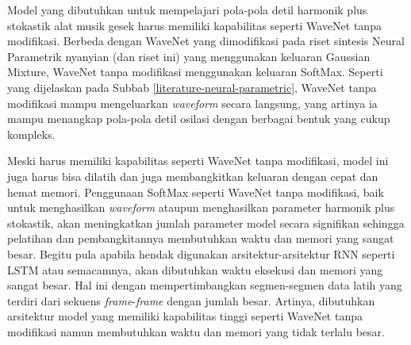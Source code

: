 Model yang dibutuhkan untuk mempelajari pola-pola detil harmonik plus stokastik alat musik gesek harus memiliki kapabilitas seperti WaveNet tanpa modifikasi. Berbeda dengan WaveNet yang dimodifikasi pada riset sintesis Neural Parametrik nyanyian (dan riset ini) yang menggunakan keluaran Gaussian Mixture, WaveNet tanpa modifikasi menggunakan keluaran SoftMax. Seperti yang dijelaskan pada Subbab \ref{literature-neural-parametric}, WaveNet tanpa modifikasi mampu mengeluarkan \textit{waveform} secara langsung, yang artinya ia mampu menangkap pola-pola detil osilasi dengan berbagai bentuk yang cukup kompleks.

Meski harus memiliki kapabilitas seperti WaveNet tanpa modifikasi, model ini juga harus bisa dilatih dan juga membangkitkan keluaran dengan cepat dan hemat memori. Penggunaan SoftMax seperti WaveNet tanpa modifikasi, baik untuk menghasilkan \textit{waveform} ataupun menghasilkan parameter harmonik plus stokastik, akan meningkatkan jumlah parameter model secara signifikan sehingga pelatihan dan pembangkitannya membutuhkan waktu dan memori yang sangat besar. Begitu pula apabila hendak digunakan arsitektur-arsitektur RNN seperti LSTM atau semacamnya, akan dibutuhkan waktu eksekusi dan memori yang sangat besar. Hal ini dengan mempertimbangkan segmen-segmen data latih yang terdiri dari sekuens \textit{frame}-\textit{frame} dengan jumlah besar. Artinya, dibutuhkan arsitektur model yang memiliki kapabilitas tinggi seperti WaveNet tanpa modifikasi namun membutuhkan waktu dan memori yang tidak terlalu besar.
